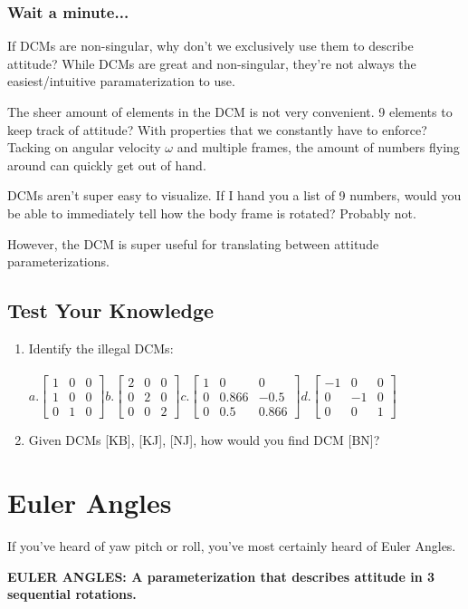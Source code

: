 \documentclass[a4paper,14pt]{extreport}
\begin{document}
\subsection{Wait a minute...}
If DCMs are non-singular, why don't we exclusively use them to describe attitude? While DCMs are great and non-singular, they're not always the easiest/intuitive paramaterization to use. 


The sheer amount of elements in the DCM is not very convenient. 9 elements to keep track of attitude? With properties that we constantly have to enforce? Tacking on angular velocity $\omega$ and multiple frames, the amount of numbers flying around can quickly get out of hand.

DCMs aren't super easy to visualize. If I hand you a list of 9 numbers, would you be able to immediately tell how the body frame is rotated? Probably not.

However, the DCM is super useful for translating between attitude parameterizations.

\section{Test Your Knowledge}
\begin{enumerate}
\item Identify the illegal DCMs:\\\\
	$
	a.
	\begin{bmatrix}
			1&0&0\\
			1&0&0\\
			0&1&0
	\end{bmatrix} 
	b.	
	\begin{bmatrix}
			2&0&0\\
			0&2&0\\
			0&0&2
	\end{bmatrix}
	c.	
	\begin{bmatrix}
			1&0&0\\
			0&0.866&-0.5\\
			0&0.5&0.866
	\end{bmatrix}
	d.
	\begin{bmatrix}
			-1&0&0\\
			0&-1&0\\
			0&0&1
	\end{bmatrix}$ 
\item{Given DCMs [KB], [KJ], [NJ], how would you find DCM [BN]?}
\end{enumerate}
\chapter{Euler Angles}
If you've heard of yaw pitch or roll, you've most certainly heard of Euler Angles.
\begin{center}
\textbf{EULER ANGLES: A parameterization that describes attitude in 3 sequential rotations.}
\end{center}
\end{document}
